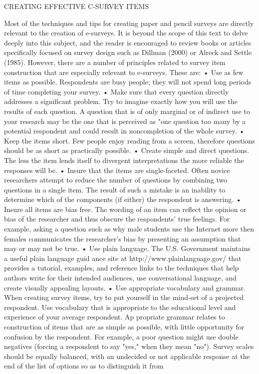 \documentclass[a4 paper,12pt]{article}
\begin{document}
CREATING EFFECTIVE C-SURVEY ITEMS 

Most of the techniques and tips for creating paper and pencil surveys are directly relevant to the creation of e-surveys. It is beyond the scope of this text to delve deeply into this subject, and the reader is encouraged to review books or articles specifically focused on survey design such as Dillman (2000) or Alreck and Settle (1985). However, there are a number of principles related to survey item construction that are especially relevant to e-surveys. These are: 
• Use as few items as possible. Respondents are busy people; they will not spend long 
periods of time completing your survey. 
• Make sure that every question directly addresses a significant problem. Try to imagine 
exactly how you will use the results of each question. A question that is of only marginal or of indirect use to your research may be the one that is perceived as "one question too many by a potential respondent and could result in noncompletion of the whole survey. 
• Keep the items short. Few people enjoy reading from a screen, therefore questions 
should be as short as practically possible. 
• Create simple and direct questions. The less the item lends itself to divergent interpretations the more reliable the responses will be. 
• Insure that the items are single-faceted. Often novice researchers attempt to reduce 
the number of questions by combining two questions in a single item. The result of such a mistake is an inability to determine which of the components (if either) 
the respondent is answering. 
• Insure all items are bias free. The wording of an item can reflect the opinion or bias 
of the researcher and thus obscure the respondents' true feelings. For example, asking a question such as why male students use the Internet more then females communicates the researcher's bias by presenting an assumption that may or may not be true. 
• Use plain language. The U.S. Government maintains a useful plain language guid 
ance site at http://www.plainlanguage.gov/ that provides a tutorial, examples, and reference links to the techniques that help authors write for their intended audiences, use conversational language, and create visually appealing layouts. 
• Use appropriate vocabulary and grammar. When creating survey items, try to put 
yourself in the mind-set of a projected respondent. Use vocabulary that is appropriate to the educational level and experience of your average respondent. Ap propriate grammar relates to construction of items that are as simple as possible, with little opportunity for confusion by the respondent. For example, a poor question might use double negatives (forcing a respondent to say "yes," when they mean "no"). Survey scales should be equally balanced, with an undecided or not applicable response at the end of the list of options so as to distinguish it from 
\end{document}
